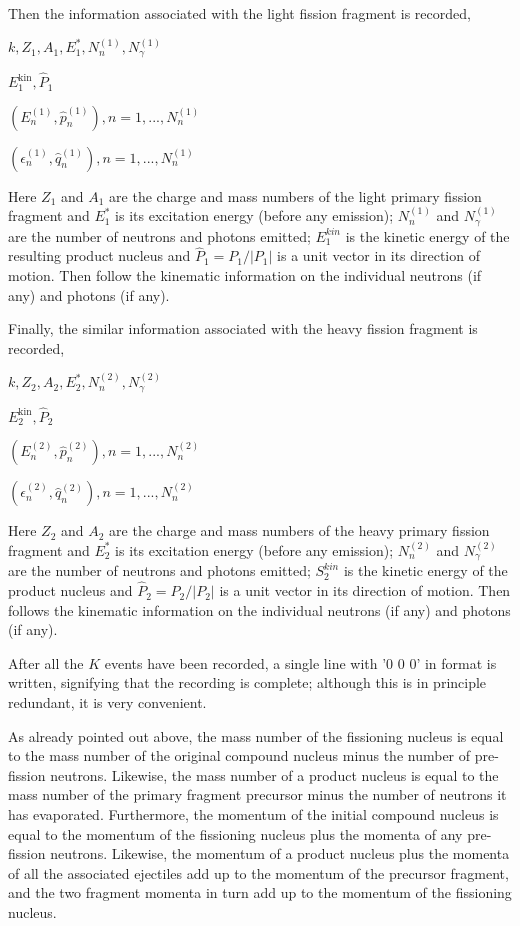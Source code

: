 \documentclass{article}
\begin{document}
Then the information associated with the light fission fragment is recorded, 

$k,Z_1,A_1,E_1^*, N_n^{(1)}, N_{\gamma}^{(1)}$

$E_1^{\text{kin}} , \hat P_1$

$(E_n^{(1)} , \hat p_n^{(1)}), n = 1, . . . ,N_n^{(1)}$

$(\epsilon_n^{(1)} , \hat q_n^{(1)}), n = 1, . . . ,N_n^{(1)}$

Here $Z_1$ and $A_1$ are the charge and mass numbers of the light primary fission fragment and $E_1^*$ is its excitation energy (before any emission); $N_n^{(1)}$ and $N_{\gamma}^{(1)}$ are the number of neutrons and photons emitted; $E_1^{kin}$ is the kinetic energy of the resulting product nucleus and $\hat P_1 = P_1/|P_1|$ is a unit vector in its direction of motion. Then follow the kinematic information on the individual neutrons (if any) and photons (if any).

Finally, the similar information associated with the heavy fission fragment is recorded,

$k,Z_2,A_2,E_2^*, N_n^{(2)}, N_{\gamma}^{(2)}$

$E_2^{\text{kin}} , \hat P_2$

$(E_n^{(2)} , \hat p_n^{(2)}), n = 1, . . . ,N_n^{(2)}$

$(\epsilon_n^{(2)} , \hat q_n^{(2)}), n = 1, . . . ,N_n^{(2)}$

Here $Z_2$ and $A_2$ are the charge and mass numbers of the heavy primary fission fragment and $E_2^*$ is its excitation energy (before any emission); $N_n^{(2)}$ and $N_{\gamma}^{(2)}$ are the number of neutrons and photons emitted; $S_2^{kin}$ is the kinetic energy of the product nucleus and $\hat P_2 = P_2/|P_2|$ is a
unit vector in its direction of motion. Then follows the kinematic information on the individual neutrons (if any) and photons (if any).

After all the $K$ events have been recorded, a single line with ’0 0 0’ in format is written, signifying that the recording is complete; although this is in principle redundant, it is very convenient.

As already pointed out above, the mass number of the fissioning nucleus is equal to the mass number of the original compound nucleus minus the number of pre-fission neutrons. Likewise, the mass number of a product nucleus is equal to the mass number of the primary fragment precursor minus the number of neutrons it has evaporated. Furthermore, the momentum of the initial compound nucleus is equal to the momentum of the fissioning nucleus plus the momenta of any pre-fission neutrons. Likewise, the momentum of a product nucleus plus the momenta of all the associated ejectiles add up to the momentum of the precursor fragment, and the two fragment momenta in turn add up to the momentum of the fissioning nucleus.
\end{document}
